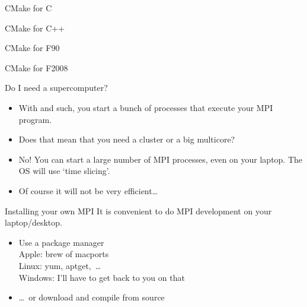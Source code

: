 \begin{c}
  \begin{numberedframe}{CMake for C}
    
  \end{numberedframe}
\end{c}

\begin{cxx}
  \begin{numberedframe}{CMake for C++}
    
  \end{numberedframe}
\end{cxx}

\begin{fortran}
\begin{numberedframe}{CMake for F90}

\end{numberedframe}
\end{fortran}

\begin{fortran}
\begin{numberedframe}{CMake for F2008}

\end{numberedframe}
\end{fortran}

\begin{numberedframe}{Do I need a supercomputer?}
  \begin{itemize}
  \item With  and such, you start a bunch of processes that
    execute your MPI program.
  \item Does that mean that you need a cluster or a big multicore?
  \item No! You can start a large number of MPI processes, even on
    your laptop. The OS will use `time slicing'.
  \item Of course it will not be very efficient\ldots
  \end{itemize}
\end{numberedframe}

\begin{numberedframe}{Installing your own MPI}
  It is convenient to do MPI development on your laptop/desktop.
  \begin{itemize}
  \item Use a package manager\\
    Apple: brew of macports\\
    Linux: yum, aptget,~\ldots\\
    Windows: I'll have to get back to you on that
  \item \ldots~or download and compile from source 
  \end{itemize}
\end{numberedframe}

